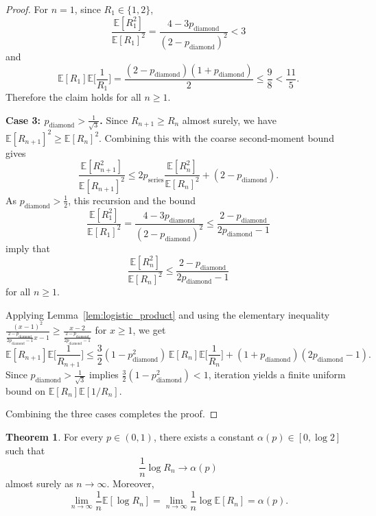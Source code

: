 \documentclass{article}
\theoremstyle{plain}
\theoremstyle{definition}
\newtheorem{theorem}{Theorem}[section]
\begin{document}
\begin{proof}
For $n=1$, since $R_1\in\{1,2\}$,
\[
\frac{\mathbb E[R_1^2]}{\mathbb E[R_1]^2}
=
\frac{4-3p_{\mathrm{diamond}}}{(2-p_{\mathrm{diamond}})^2}
<3
\]
and
\[
\mathbb E[R_1]\mathbb E\Big[\frac{1}{R_1}\Big]
=
\frac{(2-p_{\mathrm{diamond}})(1+p_{\mathrm{diamond}})}{2}
\le \frac{9}{8}
<
\frac{11}{5}.
\]
Therefore the claim holds for all $n\ge 1$.

\textbf{Case 3: $p_{\mathrm{diamond}}>\frac{1}{\sqrt 3}$.}
Since $R_{n+1}\ge R_n$ almost surely, we have $\mathbb E[R_{n+1}]^2\ge \mathbb E[R_n]^2$.
Combining this with the coarse second-moment bound gives
\[
\frac{\mathbb E[R_{n+1}^2]}{\mathbb E[R_{n+1}]^2}
\le
2p_{\mathrm{series}}\frac{\mathbb E[R_n^2]}{\mathbb E[R_n]^2}
+
(2-p_{\mathrm{diamond}}).
\]
As $p_{\mathrm{diamond}}>\frac{1}{2}$, this recursion and the bound
\[
\frac{\mathbb E[R_1^2]}{\mathbb E[R_1]^2}
=
\frac{4-3p_{\mathrm{diamond}}}{(2-p_{\mathrm{diamond}})^2}
\le
\frac{2-p_{\mathrm{diamond}}}{2p_{\mathrm{diamond}}-1}
\]
imply that
\[
\frac{\mathbb E[R_n^2]}{\mathbb E[R_n]^2}
\le
\frac{2-p_{\mathrm{diamond}}}{2p_{\mathrm{diamond}}-1}
\]
for all $n\ge 1$.

Applying Lemma~\ref{lem:logistic_product} and using the elementary inequality
$
\frac{(x-1)^2}{\frac{2-p_{\mathrm{diamond}}}{2p_{\mathrm{diamond}}-1}x-1}
\ge
\frac{x-2}{\frac{2-p_{\mathrm{diamond}}}{2p_{\mathrm{diamond}}-1}}
$
for $x\ge 1$, we get
\[
\mathbb E[R_{n+1}]\mathbb E\Big[\frac{1}{R_{n+1}}\Big]
\le
\frac{3}{2}(1-p_{\mathrm{diamond}}^2)\,
\mathbb E[R_n]\mathbb E\Big[\frac{1}{R_n}\Big]
+
(1+p_{\mathrm{diamond}})(2p_{\mathrm{diamond}}-1).
\]
Since $p_{\mathrm{diamond}}>\frac{1}{\sqrt 3}$ implies $\frac{3}{2}(1-p_{\mathrm{diamond}}^2)<1$, iteration yields a finite uniform bound on $\mathbb E[R_n]\mathbb E[1/R_n]$.

Combining the three cases completes the proof.
\end{proof}










\begin{theorem}\label{thm:reduced_quenched_exponent}
For every $p\in(0,1)$, there exists a constant $\alpha(p)\in[0,\log 2]$ such that
\[
\frac{1}{n}\log R_n\to \alpha(p)
\]
almost surely as $n\to\infty$.
Moreover,
\[
\lim_{n\to\infty}\frac{1}{n}\mathbb E[\log R_n]
=
\lim_{n\to\infty}\frac{1}{n}\log \mathbb E[R_n]
=
\alpha(p).
\]
\end{theorem}
\end{document}
